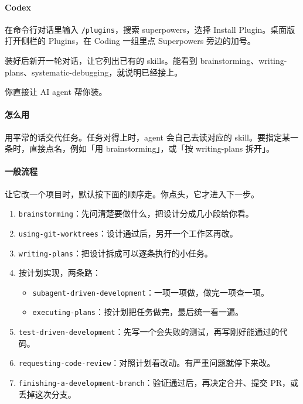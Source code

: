 \paragraph{Codex}
在命令行对话里输入 \verb|/plugins|，搜索 superpowers，选择 Install Plugin。桌面版打开侧栏的 Plugins，在 Coding 一组里点 Superpowers 旁边的加号。

装好后新开一轮对话，让它列出已有的 skills。能看到 brainstorming、writing-plans、systematic-debugging，就说明已经接上。

\begin{xiaonao}
你直接让 AI agent 帮你装。
\end{xiaonao}

\paragraph{怎么用}
用平常的话交代任务。任务对得上时，agent 会自己去读对应的 skill。要指定某一条时，直接点名，例如「用 brainstorming」，或「按 writing-plans 拆开」。

\paragraph{一般流程}
让它改一个项目时，默认按下面的顺序走。你点头，它才进入下一步。
\begin{enumerate}
\item \verb|brainstorming|：先问清楚要做什么，把设计分成几小段给你看。
\item \verb|using-git-worktrees|：设计通过后，另开一个工作区再改。
\item \verb|writing-plans|：把设计拆成可以逐条执行的小任务。
\item 按计划实现，两条路：
\begin{itemize}
\item \verb|subagent-driven-development|：一项一项做，做完一项查一项。
\item \verb|executing-plans|：按计划把任务做完，最后统一看一遍。
\end{itemize}
\item \verb|test-driven-development|：先写一个会失败的测试，再写刚好能通过的代码。
\item \verb|requesting-code-review|：对照计划看改动。有严重问题就停下来改。
\item \verb|finishing-a-development-branch|：验证通过后，再决定合并、提交 PR，或丢掉这次分支。
\end{enumerate}

